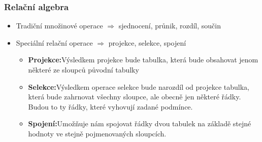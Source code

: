 \documentclass[a4paper,10pt]{article}
\newcommand{\pojem}[2]{\item \textbf{#1:}\quad #2}
\newcommand{\tedy}{$\Rightarrow$ }
\begin{document}
      \subsubsection{Relační algebra}
        \begin{itemize}
          \item Tradiční množinové operace \tedy sjednocení, průnik, rozdíl, součin
          \item Speciální relační operace \tedy projekce, selekce, spojení
          \begin{itemize}
            \pojem{Projekce}{Výsledkem projekce bude tabulka, která bude obsahovat jenom některé ze sloupců původní tabulky}
            \pojem{Selekce}{Výsledkem operace selekce bude narozdíl od projekce tabulka, která bude zahrnovat všechny sloupce, ale obecně jen některé řádky. Budou to ty řádky, které vyhovují zadané podmínce.}
            \pojem{Spojení}{Umožňuje nám spojovat řádky dvou tabulek na základě stejné hodnoty ve stejně pojmenovaných sloupcích.}

          \end{itemize}
        \end{itemize}
\end{document}
